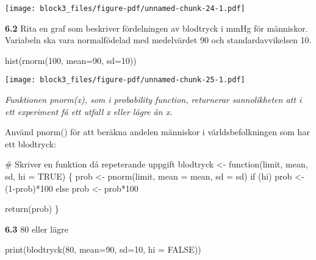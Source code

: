 \documentclass[
  letterpaper,
  DIV=11,
  numbers=noendperiod]{scrartcl}
\newenvironment{Shaded}{\begin{snugshade}}{\end{snugshade}}
\newcommand{\AttributeTok}[1]{\textcolor[rgb]{0.40,0.45,0.13}{#1}}
\newcommand{\CommentTok}[1]{\textcolor[rgb]{0.37,0.37,0.37}{#1}}
\newcommand{\ConstantTok}[1]{\textcolor[rgb]{0.56,0.35,0.01}{#1}}
\newcommand{\ControlFlowTok}[1]{\textcolor[rgb]{0.00,0.23,0.31}{#1}}
\newcommand{\DecValTok}[1]{\textcolor[rgb]{0.68,0.00,0.00}{#1}}
\newcommand{\FunctionTok}[1]{\textcolor[rgb]{0.28,0.35,0.67}{#1}}
\newcommand{\NormalTok}[1]{\textcolor[rgb]{0.00,0.23,0.31}{#1}}
\newcommand{\OtherTok}[1]{\textcolor[rgb]{0.00,0.23,0.31}{#1}}
\newcommand{\SpecialCharTok}[1]{\textcolor[rgb]{0.37,0.37,0.37}{#1}}
\begin{document}
\texttt{[image: block3\_files/figure-pdf/unnamed-chunk-24-1.pdf]}

\textbf{6.2} Rita en graf som beskriver fördelningen av blodtryck i mmHg
för människor. Variabeln ska vara normalfödelad med medelvärdet 90 och
standardavvikelsen 10.

\begin{Shaded}
\begin{Highlighting}[]
\FunctionTok{hist}\NormalTok{(}\FunctionTok{rnorm}\NormalTok{(}\DecValTok{100}\NormalTok{, }\AttributeTok{mean=}\DecValTok{90}\NormalTok{, }\AttributeTok{sd=}\DecValTok{10}\NormalTok{))}
\end{Highlighting}
\end{Shaded}

\texttt{[image: block3\_files/figure-pdf/unnamed-chunk-25-1.pdf]}

\emph{Funktionen pnorm(x), som i probability function, returnerar
sannolikheten att i ett experiment få ett utfall x eller lägre än x.}

Använd pnorm() för att beräkna andelen människor i världsbefolkningen
som har ett blodtryck:

\begin{Shaded}
\begin{Highlighting}[]
\CommentTok{\# Skriver en funktion då repeterande uppgift}
\NormalTok{blodtryck }\OtherTok{\textless{}{-}} \ControlFlowTok{function}\NormalTok{(limit, mean, sd, }\AttributeTok{hi =} \ConstantTok{TRUE}\NormalTok{) \{}
\NormalTok{  prob }\OtherTok{\textless{}{-}} \FunctionTok{pnorm}\NormalTok{(limit, }\AttributeTok{mean =}\NormalTok{ mean, }\AttributeTok{sd =}\NormalTok{ sd)}
  \ControlFlowTok{if}\NormalTok{ (hi)}
\NormalTok{    prob }\OtherTok{\textless{}{-}}\NormalTok{ (}\DecValTok{1}\SpecialCharTok{{-}}\NormalTok{prob)}\SpecialCharTok{*}\DecValTok{100}
  \ControlFlowTok{else}
\NormalTok{    prob }\OtherTok{\textless{}{-}}\NormalTok{ prob}\SpecialCharTok{*}\DecValTok{100}

  \FunctionTok{return}\NormalTok{(prob)}
\NormalTok{\}}
\end{Highlighting}
\end{Shaded}

\textbf{6.3} 80 eller lägre

\begin{Shaded}
\begin{Highlighting}[]
\FunctionTok{print}\NormalTok{(}\FunctionTok{blodtryck}\NormalTok{(}\DecValTok{80}\NormalTok{, }\AttributeTok{mean=}\DecValTok{90}\NormalTok{, }\AttributeTok{sd=}\DecValTok{10}\NormalTok{, }\AttributeTok{hi =} \ConstantTok{FALSE}\NormalTok{))}
\end{Highlighting}
\end{Shaded}
\end{document}
